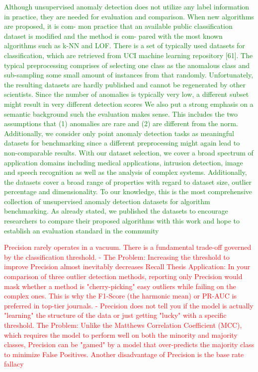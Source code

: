 \textcolor{green}
{Although unsupervised anomaly detection does not utilize any label information in practice,
they are needed for evaluation and comparison. When new algorithms are proposed, it is com-
mon practice that an available public classification dataset is modified and the method is com-
pared with the most known algorithms such as k-NN and LOF. There is a set of typically used
datasets for classification, which are retrieved from UCI machine learning repository [61]. The
typical preprocessing comprises of selecting one class as the anomalous class and sub-sampling
some small amount of instances from that randomly. Unfortunately, the resulting datasets are
hardly published and cannot be regenerated by other scientists. Since the number of anomalies
is typically very low, a different subset might result in very different detection scores
We also put a
strong emphasis on a semantic background such the evaluation makes sense. This includes the
two assumptions that (1) anomalies are rare and (2) are different from the norm. Additionally,
we consider only point anomaly detection tasks as meaningful datasets for benchmarking since
a different preprocessing might again lead to non-comparable results.
With our dataset selection, we cover a
broad spectrum of application domains including medical applications, intrusion detection,
image and speech recognition as well as the analysis of complex systems. Additionally, the
datasets cover a broad range of properties with regard to dataset size, outlier percentage and
dimensionality. To our knowledge, this is the most comprehensive collection of unsupervised
anomaly detection datasets for algorithm benchmarking. As already stated, we published the
datasets to encourage researchers to compare their proposed algorithms with this work and
hope to establish an evaluation standard in the community \citep[p.20]{goldstein2016comparative}}

\textcolor{red}{Precision rarely operates in a vacuum. There is a fundamental trade-off governed by the classification threshold.
    -   The Problem: Increasing the threshold to improve Precision almost inevitably decreases Recall %
    Thesis Application: In your comparison of three outlier detection methods, reporting only Precision would mask whether a method is "cherry-picking" easy outliers while failing on the complex ones. 
    This is why the F1-Score (the harmonic mean) or PR-AUC is preferred in top-tier journals.
    -   Precision does not tell you if the model is actually "learning" the structure of the data or just getting "lucky" with a specific threshold.
    The Problem: Unlike the Matthews Correlation Coefficient (MCC), which requires the model to perform well on both the minority and majority classes, Precision can be "gamed" by a model that over-predicts the majority class to minimize False Positives.
    Another disadvantage of Precision is the base rate fallacy 
    }


